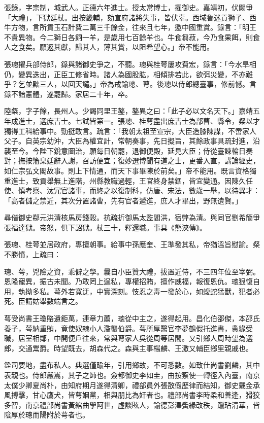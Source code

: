 \begin{pinyinscope}
張錄，字宗制，城武人。正德六年進士。授太常博士，擢御史。嘉靖初，伏闕爭「大禮」，下獄廷杖。出按畿輔，劾宣府諸將失事，皆伏辜。西域魯迷貢獅子、西牛方物，言所貢玉石計費二萬三千餘金，往來且七年，邀中國重賞。錄言：「明王不貴異物。今二獅日各飼一羊，是歲用七百餘羊也。牛食芻菽，今乃食果餌，則食人之食矣。願返其獻，歸其人，薄其賞，以阻希望心。」帝不能用。

張璁擢兵部侍郎，錄與諸御史爭之，不聽。璁與桂萼屢攻費宏，錄言：「今水旱相仍，變異迭出，正臣工修省時。諸人為國股肱，相傾排若此，欲弭災變，不亦難乎？乞並黜三人，以回天譴。」帝為戒諭璁、萼。後璁以侍郎總臺事，修前憾。言錄不諳憲體，遂罷歸。家居二十年，卒。

陸粲，字子餘，長州人。少謁同里王鏊，鏊異之曰：「此子必以文名天下。」嘉靖五年成進士，選庶吉士。七試皆第一。張璁、桂萼盡出庶吉士為部曹、縣令，粲以才獨得工科給事中。勁挺敢言。疏言：「我朝太祖至宣宗，大臣造膝陳謀，不啻家人父子。自英宗幼沖，大臣為權宜計，常朝奏事，先日擬旨，其餘政事具疏封進，沿襲至今。今陛下銳意圖治，願每日朝罷，退御便殿，延見大臣；侍從臺諫輪日奏對；撫按籓臬廷辭入謝，召訪便宜；復妙選博聞有道之士，更番入直，講論經史，如仁宗弘文閣故事。則上下情通，而天下事畢陳於前矣。」帝不能用。既言資格獨重進士，致貢舉無上進階，州縣教職過輕，王官終身禁錮，皆宜變通。因陳久任使、慎考察、汰冗官諸事，而終之以復制科，仿唐、宋法，數歲一舉，以待異才：「高者儲之禁近，其次分置諸曹，先有官者遞進，庶人才畢出，野無遺賢。」

尋偕御史郗元洪清核馬房錢穀。抗疏折御馬太監閻洪，宿弊為清。與同官劉希簡爭張福達獄。帝怒，俱下詔獄。杖三十，釋還職。事具《熊浹傳》。

張璁、桂萼並居政府，專擅朝事。給事中孫應奎、王準發其私，帝猶溫旨慰諭。粲不勝憤，上疏曰：

璁、萼，兇險之資，乖僻之學。曩自小臣贊大禮，拔置近侍，不三四年位至宰弼。恩隆寵異，振古未聞。乃敢罔上逞私，專權招賄，擅作威福，報復恩仇。璁狠愎自用，執拗多私。萼外若寬迂，中實深刻。忮忍之毒一發於心，如蝮蛇猛獸，犯者必死。臣請姑舉數端言之。

萼受尚書王瓊賂遺鉅萬，連章力薦，璁從中主之，遂得起用。昌化伯邵傑，本邵氏養子，萼納重賄，竟使奴隸小人濫襲伯爵。萼所厚醫官李夢鶴假托進書，夤緣受職，居室相鄰，中開便戶往來，常與萼家人吳從周等居間。又引鄉人周時望為選郎，交通鬻爵。時望既去，胡森代之。森與主事楊麟、王激又輔臣鄉里親戚也。

銓司要地，盡布私人。典選僅踰年，引用鄉故，不可悉數。如致仕尚書劉麟，其中表親也。侍郎嚴嵩，其子之師也。僉都御史李如圭，由按察使一轉徑入內臺，南京太僕少卿夏尚朴，由知府期月遂得清卿，禮部員外張敔假歷律而結知，御史戴金承風搏擊，甘心鷹犬，皆萼姻黨，相與朋比為奸者也。禮部尚書李時柔和善逢，猾狡多智，南京禮部尚書黃綰曲學阿世，虛談眩人，諭德彭澤夤緣改秩，躐玷清華，皆陰厚於璁而陽附於萼者也。


\end{pinyinscope}
